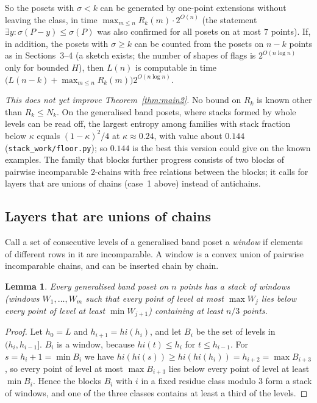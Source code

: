 \documentclass[11pt]{article}
\newtheorem{lemma}[theorem]{Lemma}
\theoremstyle{definition}
\theoremstyle{remark}
\begin{document}
So the posets with $\sigma<k$ can be generated by one-point extensions without leaving the
class, in time $\max_{m\le n}R_k(m)\cdot2^{O(n)}$ (the statement
$\exists y\colon\sigma(P-y)\le\sigma(P)$ was also confirmed for all posets on at most $7$
points). If, in addition, the posets with $\sigma\ge k$ can be counted from the posets on
$n-k$ points as in Sections~3--4 (a sketch exists; the number of shapes of flags is
$2^{O(n\log n)}$ only for bounded $H$), then $L(n)$ is computable in time
$\bigl(L(n-k)+\max_{m\le n}R_k(m)\bigr)2^{O(n\log n)}$.

\medskip\noindent\emph{This does not yet improve Theorem~\ref{thm:main2}.} No bound on
$R_k$ is known other than $R_k\le N_k$. On the generalised band posets, where stacks formed
by whole levels can be read off, the largest entropy among families with stack fraction
below $\kappa$ equals $(1-\kappa)^2/4$ at $\kappa\approx0.24$, with value about $0.144$
(\texttt{stack\_work/floor.py}); so $0.144$ is the best this version could give on the known
examples. The family that blocks further progress consists of two blocks of pairwise
incomparable $2$-chains with free relations between the blocks; it calls for layers that
are unions of chains (case~1 above) instead of antichains.

\subsection*{Layers that are unions of chains}

Call a set of consecutive levels of a generalised band poset a \emph{window} if elements of
different rows in it are incomparable. A window is a convex union of pairwise incomparable
chains, and can be inserted chain by chain.

\begin{lemma}\label{lem:third}
Every generalised band poset on $n$ points has a stack of windows (windows
$W_1,\dots,W_m$ such that every point of level at most $\max W_j$ lies below every point of
level at least $\min W_{j+1}$) containing at least $n/3$ points.
\end{lemma}
\begin{proof}
Let $h_0=L$ and $h_{i+1}=\mathit{hi}(h_i)$, and let $B_i$ be the set of levels in
$(h_i,h_{i-1}]$. $B_i$ is a window, because $\mathit{hi}(t)\le h_i$ for $t\le h_{i-1}$.
For $s=h_i+1=\min B_i$ we have
$\mathit{hi}(\mathit{hi}(s))\ge\mathit{hi}(\mathit{hi}(h_i))=h_{i+2}=\max B_{i+3}$,
so every point of level at most $\max B_{i+3}$ lies below every point of level at least
$\min B_i$. Hence the blocks $B_i$ with $i$ in a fixed residue class modulo $3$ form a stack
of windows, and one of the three classes contains at least a third of the levels.
\end{proof}
\end{document}
